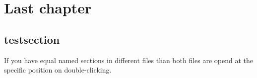 \chapter{Last chapter}
\label{chap5}
\thispagestyle{empty}

\section{testsection}

If you have equal named sections in different files than both 
files are opend at the specific position on double-clicking.

